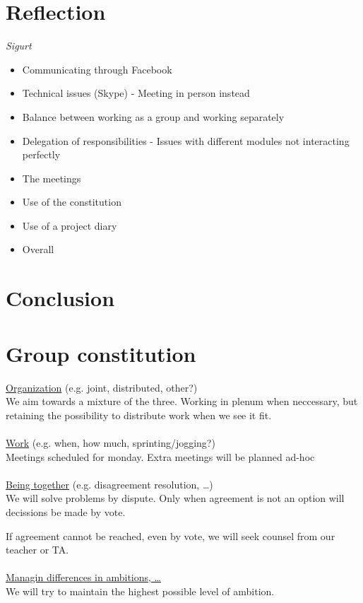 \documentclass[a4paper,11pt]{article}
\begin{document}
\section{Reflection}
\textsl{Sigurt}
\begin{itemize}
	\item Communicating through Facebook
	\item Technical issues (Skype) - Meeting in person instead
	\item Balance between working as a group and working separately
	\item Delegation of responsibilities - Issues with different modules not interacting perfectly
	\item The meetings
	\item Use of the constitution
	\item Use of a project diary
	\item Overall
\end{itemize}


\pagebreak
\section{Conclusion}
\label{sec:Conclusion}


\pagebreak
\appendix
\section{Group constitution}
\underline{Organization} (e.g. joint, distributed, other?) \\
We aim towards a mixture of the three. Working in plenum when neccessary, but retaining the possibility to distribute work when we see it fit. \\ \\
\underline{Work} (e.g. when, how much, sprinting/jogging?) \\
Meetings scheduled for monday.
Extra meetings will be planned ad-hoc \\ \\
\underline{Being together} (e.g. disagreement resolution, \ldots) \\
We will solve problems by dispute. Only when agreement is not an option will decissions be made by vote.

If agreement cannot be reached, even by vote, we will seek counsel from our teacher or TA. \\ \\
\underline{Managin differences in ambitions, \ldots} \\
We will try to maintain the highest possible level of ambition. \\
\end{document}
